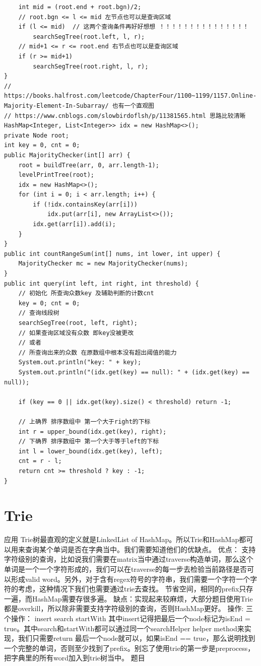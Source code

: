 \documentclass[9pt, b5paper]{article}
\begin{document}
\begin{verbatim}
    int mid = (root.end + root.bgn)/2;
    // root.bgn <= l <= mid 左节点也可以是查询区域
    if (l <= mid)  // 这两个查询条件再好好想想 ！！！！！！！！！！！！！！！
        searchSegTree(root.left, l, r);
    // mid+1 <= r <= root.end 右节点也可以是查询区域
    if (r >= mid+1) 
        searchSegTree(root.right, l, r);
}
// https://books.halfrost.com/leetcode/ChapterFour/1100~1199/1157.Online-Majority-Element-In-Subarray/ 也有一个直观图
// https://www.cnblogs.com/slowbirdoflsh/p/11381565.html 思路比较清晰
HashMap<Integer, List<Integer>> idx = new HashMap<>();
private Node root;
int key = 0, cnt = 0;
public MajorityChecker(int[] arr) {
    root = buildTree(arr, 0, arr.length-1);
    levelPrintTree(root);
    idx = new HashMap<>();
    for (int i = 0; i < arr.length; i++) {
        if (!idx.containsKey(arr[i]))
            idx.put(arr[i], new ArrayList<>());
        idx.get(arr[i]).add(i);
    }
}
public int countRangeSum(int[] nums, int lower, int upper) {
    MajorityChecker mc = new MajorityChecker(nums);
}
public int query(int left, int right, int threshold) {
    // 初始化 所查询众数key 及辅助判断的计数cnt
    key = 0; cnt = 0;
    // 查询线段树
    searchSegTree(root, left, right);
    // 如果查询区域没有众数 即key没被更改
    // 或者
    // 所查询出来的众数 在原数组中根本没有超出阈值的能力
    System.out.println("key: " + key);
    System.out.println("(idx.get(key) == null): " + (idx.get(key) == null));

    if (key == 0 || idx.get(key).size() < threshold) return -1;

    // 上确界 排序数组中 第一个大于right的下标
    int r = upper_bound(idx.get(key), right);
    // 下确界 排序数组中 第一个大于等于left的下标
    int l = lower_bound(idx.get(key), left);
    cnt = r - l;
    return cnt >= threshold ? key : -1;
}
\end{verbatim}

\section{Trie}
\label{sec-13}
应用
Trie树最直观的定义就是LinkedList of HashMap。所以Trie和HashMap都可以用来查询某个单词是否在字典当中。我们需要知道他们的优缺点。
优点：
支持字符级别的查询，比如说我们需要在matrix当中通过traverse构造单词，那么这个单词是一个一个字符形成的，我们可以在traverse的每一步去检验当前路径是否可以形成valid word。另外，对于含有regex符号的字符串，我们需要一个字符一个字符的考虑，这种情况下我们也需要通过trie去查找。
节省空间，相同的prefix只存一遍，而HashMap需要存很多遍。
缺点：实现起来较麻烦，大部分题目使用Trie都是overkill，所以除非需要支持字符级别的查询，否则HashMap更好。
操作: 三个操作：
insert
search
startWith
其中insert记得把最后一个node标记为isEnd = true。其中search和startWith都可以通过同一个searchHelper helper method来实现，我们只需要return 最后一个node就可以，如果isEnd == true，那么说明找到一个完整的单词，否则至少找到了prefix。别忘了使用trie的第一步是preprocess，把字典里的所有word加入到trie树当中。
题目
\end{document}
